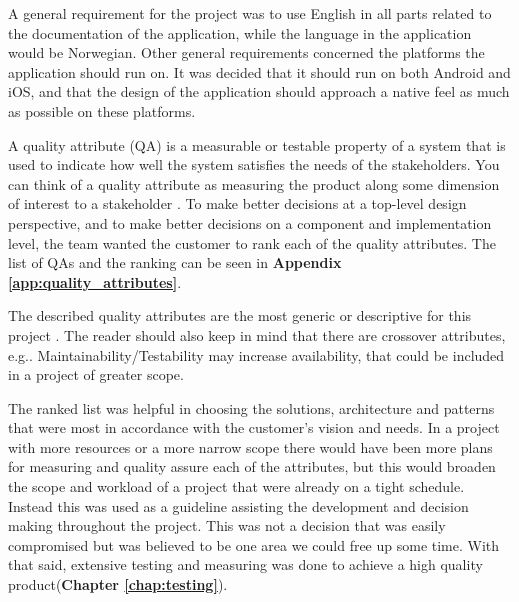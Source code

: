 A general requirement for the project was to use English in all parts related to the documentation of the application, while the language in the application would be Norwegian. Other general requirements concerned the platforms the application should run on. It was decided that it should run on both Android and iOS, and that the design of the application should approach a native feel as much as possible on these platforms.\newline

A quality attribute (QA) is a measurable or testable property of a system that is used to indicate how well the system satisfies the needs of the stakeholders. You can think of a quality attribute as measuring the product along some dimension of interest to a stakeholder \cite[p.63]{Bass:2012:SAP:2392670}. To make better decisions at a top-level design perspective, and to make better decisions on a component and implementation level, the team wanted the customer to rank each of the quality attributes. The list of QAs and the ranking can be seen in \textbf{Appendix \ref{app:quality_attributes}}. \newline

The described quality attributes are the most generic or descriptive for this project . The reader should also keep in mind that there are crossover attributes, e.g.. Maintainability/Testability may increase availability, that could be included in a project of greater scope.\newline

The ranked list was helpful in choosing the solutions, architecture and patterns that were most in accordance with the customer's vision and needs. In a project with more resources or a more narrow scope there would have been more plans for measuring and quality assure each of the attributes, but this would broaden the scope and workload of a project that were already on a tight schedule. Instead this was used as a guideline assisting the development and decision making throughout the project. This was not a decision that was easily compromised but was believed to be one area we could free up some time. With that said, extensive testing and measuring was done to achieve a high quality product(\textbf{Chapter \ref{chap:testing}}).\newline






